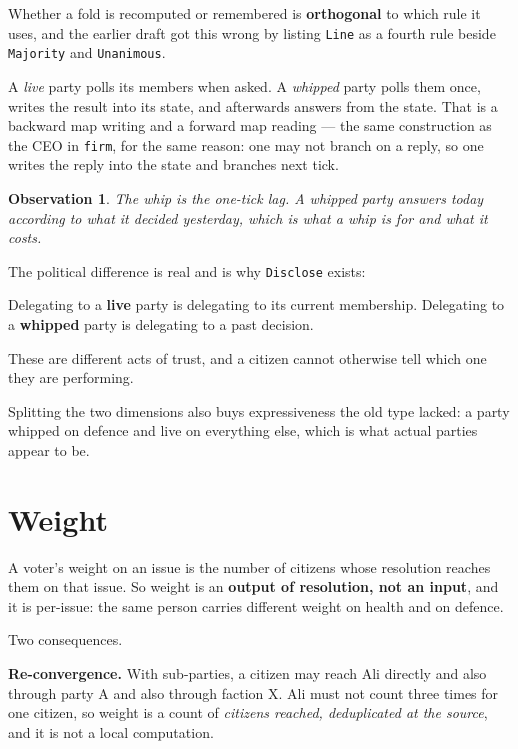 \documentclass[11pt,a4paper]{article}
\newtheorem*{obs}{Observation}
\begin{document}
Whether a fold is recomputed or remembered is \textbf{orthogonal} to which rule
it uses, and the earlier draft got this wrong by listing \texttt{Line} as a
fourth rule beside \texttt{Majority} and \texttt{Unanimous}.

A \emph{live} party polls its members when asked. A \emph{whipped} party polls
them once, writes the result into its state, and afterwards answers from the
state. That is a backward map writing and a forward map reading --- the same
construction as the CEO in \texttt{firm}, for the same reason: one may not
branch on a reply, so one writes the reply into the state and branches next
tick.

\begin{obs}
The whip \emph{is} the one-tick lag. A whipped party answers today according to
what it decided yesterday, which is what a whip is for and what it costs.
\end{obs}

The political difference is real and is why \texttt{Disclose} exists:

\begin{sectionbox}
Delegating to a \textbf{live} party is delegating to its current membership.
Delegating to a \textbf{whipped} party is delegating to a past decision.

These are different acts of trust, and a citizen cannot otherwise tell which one
they are performing.
\end{sectionbox}

Splitting the two dimensions also buys expressiveness the old type lacked: a
party whipped on defence and live on everything else, which is what actual
parties appear to be.

\section{Weight}

A voter's weight on an issue is the number of citizens whose resolution reaches
them on that issue. So weight is an \textbf{output of resolution, not an input},
and it is per-issue: the same person carries different weight on health and on
defence.

Two consequences.

\textbf{Re-convergence.} With sub-parties, a citizen may reach Ali directly and
also through party A and also through faction X. Ali must not count three times
for one citizen, so weight is a count of \emph{citizens reached, deduplicated at
the source}, and it is not a local computation.
\end{document}
